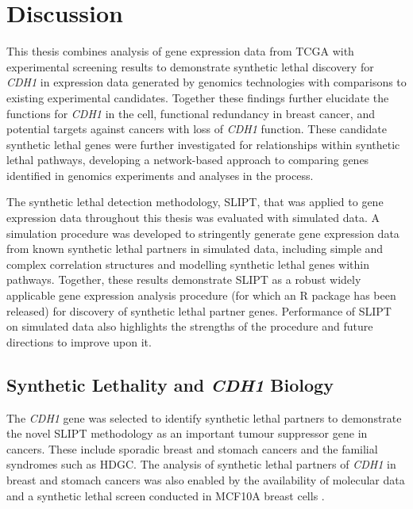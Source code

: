 \chapter{Discussion}
\label{chap:discussion}

This thesis combines analysis of gene expression data from \gls{TCGA} with experimental screening results \citep{Telford2015} to demonstrate synthetic lethal discovery for \textit{CDH1} in expression data generated by genomics technologies with comparisons to existing experimental candidates. Together these findings further elucidate the functions for \textit{CDH1} in the cell, functional redundancy in breast cancer, and potential targets against cancers with loss of \textit{CDH1} function. These candidate synthetic lethal genes were further investigated for relationships within synthetic lethal pathways, developing a network-based approach to comparing genes identified in genomics experiments and analyses in the process.

The synthetic lethal detection methodology, \gls{SLIPT}, that was applied to gene expression data throughout this thesis was evaluated with simulated data. A simulation procedure was developed to stringently generate gene expression data from known synthetic lethal partners in simulated data, including simple and complex correlation structures and modelling synthetic lethal genes within pathways. Together, these results demonstrate \gls{SLIPT} as a robust widely applicable gene expression analysis procedure (for which an R package has been released) for discovery of synthetic lethal partner genes. Performance of \gls{SLIPT} on simulated data also highlights the strengths of the procedure and future directions to improve upon it.

\section{Synthetic Lethality and \textit{CDH1} Biology}
\label{chapt6:implications}

The \textit{CDH1} gene was selected to identify synthetic lethal partners to demonstrate the novel \gls{SLIPT} methodology as an important tumour suppressor gene in cancers. These include sporadic breast and stomach cancers and the familial syndromes such as \gls{HDGC}. The analysis of synthetic lethal partners of \textit{CDH1} in breast and stomach cancers was also enabled by the availability of molecular data \citep{TCGA2012, TCGA2014GC} and a synthetic lethal screen conducted in MCF10A breast cells \citep{Chen2014, Telford2015}.


